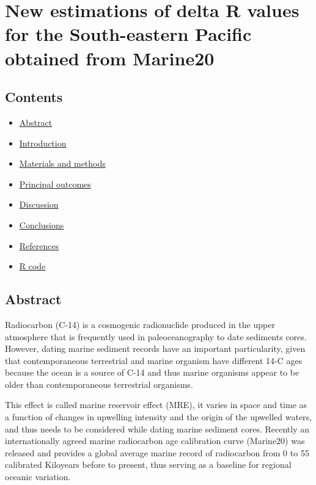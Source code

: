 \documentclass[
]{article}
\author{}
\date{\vspace{-2.5em}}
\providecommand{\tightlist}{%
  \setlength{\itemsep}{0pt}\setlength{\parskip}{0pt}}
\begin{document}
\hypertarget{new-estimations-of-delta-r-values-for-the-south-eastern-pacific-obtained-from-marine20}{%
\section{New estimations of delta R values for the South-eastern Pacific
obtained from
Marine20}\label{new-estimations-of-delta-r-values-for-the-south-eastern-pacific-obtained-from-marine20}}

\hypertarget{contents}{%
\subsection{Contents}\label{contents}}

\begin{itemize}
\tightlist
\item
  \protect\hyperlink{abstract}{Abstract}
\item
  \protect\hyperlink{introduction}{Introduction}
\item
  \protect\hyperlink{materials-and-methods}{Materials and methods}
\item
  \protect\hyperlink{principal-outcomes}{Principal outcomes}
\item
  \protect\hyperlink{ux5cux23discussion}{Discussion}
\item
  \protect\hyperlink{conclusions}{Conclusions}
\item
  \protect\hyperlink{references}{References}
\item
  \protect\hyperlink{r-code}{R code}
\end{itemize}

\hypertarget{abstract}{%
\subsection{Abstract}\label{abstract}}

Radiocarbon (C-14) is a cosmogenic radionuclide produced in the upper
atmosphere that is frequently used in paleoceanography to date sediments
cores. However, dating marine sediment records have an important
particularity, given that contemporaneous terrestrial and marine
organism have different 14-C ages because the ocean is a source of C-14
and thus marine organisms appear to be older than contemporaneous
terrestrial organisms.

This effect is called marine reservoir effect (MRE), it varies in space
and time as a function of changes in upwelling intensity and the origin
of the upwelled waters, and thus needs to be considered while dating
marine sediment cores. Recently an internationally agreed marine
radiocarbon age calibration curve (Marine20) was released and provides a
global average marine record of radiocarbon from 0 to 55 calibrated
Kiloyears before to present, thus serving as a baseline for regional
oceanic variation.
\end{document}

